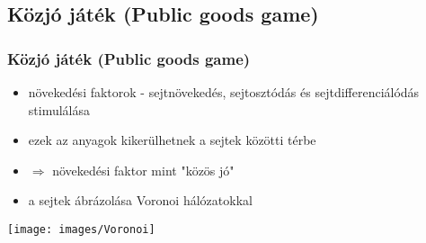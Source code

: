 \subsection{Közjó játék (Public goods game)}
\begin{frame}
	\frametitle{Közjó játék (Public goods game)}
	\begin{itemize}
		\item növekedési faktorok - sejtnövekedés, sejtosztódás és sejtdifferenciálódás stimulálása
		\item ezek az anyagok kikerülhetnek a sejtek közötti térbe
		\item $\Rightarrow$ növekedési faktor mint "közös jó"
		\item a sejtek ábrázolása Voronoi hálózatokkal
	\end{itemize}
	\centering
	\texttt{[image: images/Voronoi]}
\end{frame}

\iffalse
\subsection{A játékmodell felépítése}
\subsubsection{Voronoi diagram}
\begin{frame}
	\frametitle{Voronoi diagram}
	\begin{block}{}
		\begin{itemize}
			\item a sejtek ábrázolása Voronoi hálózatokkal
			\item \sout{szabályos pontrács}
			\item \sout{skála-független hálózatok}
		\end{itemize}
	\end{block}
	\centering
	\texttt{[image: images/Voronoi]}
\end{frame}
\fi

